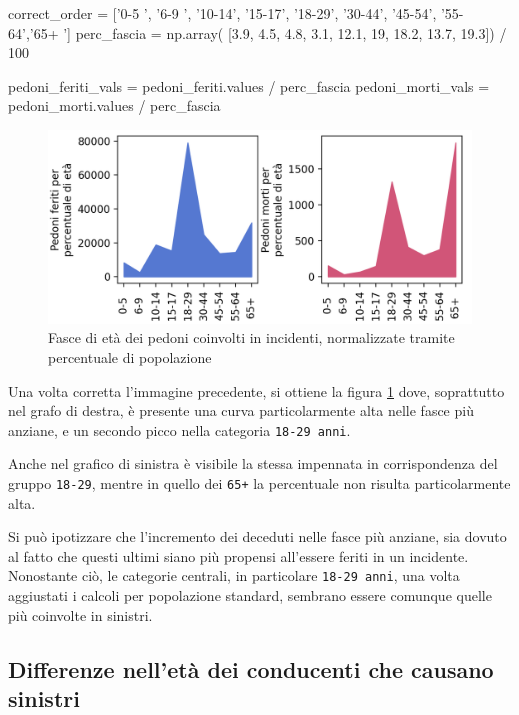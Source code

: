 \documentclass[a4paper,12pt]{report}
\newcommand{\columnstyle}[1]{\texttt{#1}}
\begin{document}
\begin{code}
correct_order = ['0-5  ', '6-9  ', '10-14', '15-17', '18-29', '30-44', '45-54', '55-64','65+  ']
perc_fascia = np.array( [3.9, 4.5, 4.8, 3.1, 12.1, 19, 18.2, 13.7, 19.3]) / 100

pedoni_feriti_vals = pedoni_feriti.values / perc_fascia
pedoni_morti_vals = pedoni_morti.values / perc_fascia
\end{code}

\begin{figure}
    \includegraphics[width=\linewidth]{../src/incidenti/incidenti_senza_coords/pedoni/eta_pedoni_norm.png}
    \caption{Fasce di età dei pedoni coinvolti in incidenti, normalizzate tramite percentuale di popolazione}
    \label{fig:eta-pedoni-norm}
\end{figure}

Una volta corretta l'immagine precedente, si ottiene la figura \ref{fig:eta-pedoni-norm} 
dove, soprattutto nel grafo di destra, è presente una curva particolarmente alta 
nelle fasce più anziane, e un secondo picco nella categoria \columnstyle{18-29 anni}. 

Anche nel grafico di sinistra è visibile la stessa impennata in corrispondenza 
del gruppo \columnstyle{18-29}, mentre in quello dei \columnstyle{65+} la 
percentuale non risulta particolarmente alta. 

Si può ipotizzare che l'incremento dei deceduti nelle fasce più anziane, sia dovuto al 
fatto che questi ultimi siano più propensi all'essere feriti in un incidente. 
Nonostante ciò, le categorie centrali, in particolare \columnstyle{18-29 anni}, 
una volta aggiustati i calcoli per popolazione standard, sembrano essere comunque 
quelle più coinvolte in sinistri. 

\subsection{Differenze nell'età dei conducenti che causano sinistri}
\end{document}

